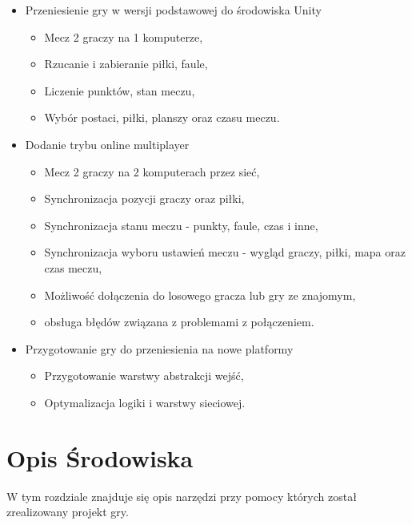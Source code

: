 \documentclass[a4paper,12pt,twoside,openany]{report}
\begin{document}
\begin{itemize}
    \item Przeniesienie gry w wersji podstawowej do środowiska Unity
    \begin{itemize}
        \item Mecz 2 graczy na 1 komputerze,
        \item Rzucanie i zabieranie piłki, faule,
        \item Liczenie punktów, stan meczu,
        \item Wybór postaci, piłki, planszy oraz czasu meczu.
    \end{itemize}
    
    \item Dodanie trybu online multiplayer
    \begin{itemize}
        \item Mecz 2 graczy na 2 komputerach przez sieć,
        \item Synchronizacja pozycji graczy oraz piłki,
        \item Synchronizacja stanu meczu - punkty, faule, czas i inne,
        \item Synchronizacja wyboru ustawień meczu - wygląd graczy, piłki, mapa oraz czas meczu,
        \item Możliwość dołączenia do losowego gracza lub gry ze znajomym,
        \item obsługa błędów związana z problemami z połączeniem.
    \end{itemize}
    
    \item Przygotowanie gry do przeniesienia na nowe platformy
    \begin{itemize}
        \item Przygotowanie warstwy abstrakcji wejść,
        \item Optymalizacja logiki i warstwy sieciowej.
    \end{itemize}
\end{itemize}



\chapter{Opis Środowiska}
W tym rozdziale znajduje się opis narzędzi przy pomocy których został zrealizowany projekt gry.
\end{document}

